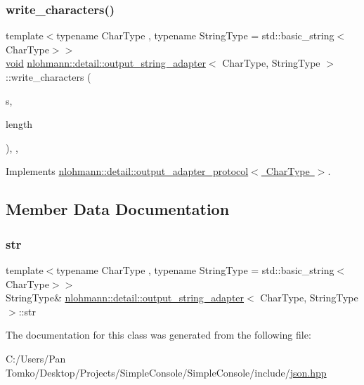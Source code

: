 \subsubsection{\texorpdfstring{write\_characters()}{write\_characters()}}
{\footnotesize\ttfamily template$<$typename Char\+Type , typename String\+Type  = std\+::basic\+\_\+string$<$\+Char\+Type$>$$>$ \\
\mbox{\hyperlink{namespacenlohmann_1_1detail_a59fca69799f6b9e366710cb9043aa77d}{void}} \mbox{\hyperlink{classnlohmann_1_1detail_1_1output__string__adapter}{nlohmann\+::detail\+::output\+\_\+string\+\_\+adapter}}$<$ Char\+Type, String\+Type $>$\+::write\+\_\+characters (\begin{DoxyParamCaption}\item[{const Char\+Type $\ast$}]{s,  }\item[{std\+::size\+\_\+t}]{length }\end{DoxyParamCaption})\hspace{0.3cm}{\ttfamily [inline]}, {\ttfamily [override]}, {\ttfamily [virtual]}}



Implements \mbox{\hyperlink{structnlohmann_1_1detail_1_1output__adapter__protocol_a2f410a164e0eda17cf6561114b0eee4a}{nlohmann\+::detail\+::output\+\_\+adapter\+\_\+protocol$<$ Char\+Type $>$}}.



\subsection{Member Data Documentation}
\mbox{\label{classnlohmann_1_1detail_1_1output__string__adapter_ae57cf7d5c5ec641e25860bb9fb8e6cb9}} 
\subsubsection{\texorpdfstring{str}{str}}
{\footnotesize\ttfamily template$<$typename Char\+Type , typename String\+Type  = std\+::basic\+\_\+string$<$\+Char\+Type$>$$>$ \\
String\+Type\& \mbox{\hyperlink{classnlohmann_1_1detail_1_1output__string__adapter}{nlohmann\+::detail\+::output\+\_\+string\+\_\+adapter}}$<$ Char\+Type, String\+Type $>$\+::str\hspace{0.3cm}{\ttfamily [private]}}



The documentation for this class was generated from the following file\+:\begin{DoxyCompactItemize}
\item 
C\+:/\+Users/\+Pan Tomko/\+Desktop/\+Projects/\+Simple\+Console/\+Simple\+Console/include/\mbox{\hyperlink{json_8hpp}{json.\+hpp}}\end{DoxyCompactItemize}
